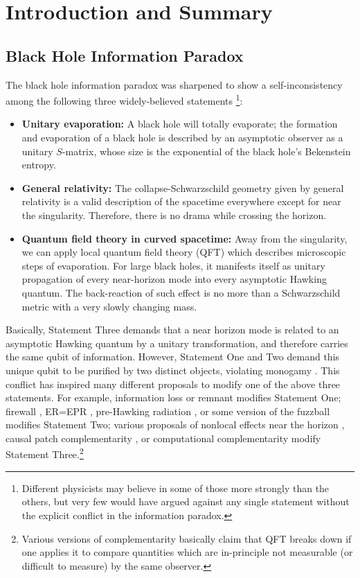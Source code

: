 \documentclass[aps,showpacs,onecolumn,floats,prd,superscriptaddress,nofootinbib]{revtex4-1}
\begin{document}
\maketitle


\section{Introduction and Summary}

\subsection{Black Hole Information Paradox}

The black hole information paradox \cite{Haw76a} was sharpened to show a self-inconsistency among the following three widely-believed statements \cite{AMPS}\footnote{Different physicists may believe in some of those more strongly than the others, but very few would have argued against any single statement without the explicit conflict in the information paradox.}:
\begin{itemize}
\item {\bf Unitary evaporation:} A black hole will totally evaporate; the formation and evaporation of a black hole is described by an asymptotic observer as a unitary $S$-matrix, whose size is the exponential of the black hole's Bekenstein entropy.
\item {\bf General relativity:} The collapse-Schwarzschild geometry given by general relativity is a valid description of the spacetime everywhere except for near the singularity.
Therefore, there is no drama while crossing the horizon.
\item {\bf Quantum field theory in curved spacetime:} Away from the singularity, we can apply local quantum field theory (QFT) which describes microscopic steps of evaporation. 
For large black holes, it manifests itself as unitary propagation of every near-horizon mode into every asymptotic Hawking quantum. The back-reaction of such effect is no more than a Schwarzschild metric with a very slowly changing mass.
\end{itemize}
Basically, Statement Three demands that a near horizon mode is related to an asymptotic Hawking quantum by a unitary transformation, and therefore carries the same qubit of information. 
However, Statement One and Two demand this unique qubit to be purified by two distinct objects, violating monogamy \cite{Bou13}. 
This conflict has inspired many different proposals to modify one of the above three statements. 
For example, information loss or remnant \cite{Bek94} modifies Statement One; 
firewall \cite{BraPir09,AMPS}, ER=EPR \cite{MalSus13}, pre-Hawking radiation \cite{KawMat13,Ho16}, or some version of the fuzzball \cite{Mat15} modifies Statement Two;
various proposals of nonlocal effects near the horizon \cite{Gid12,DodSil15,OsuPag16}, causal patch complementarity \cite{HuiYan13,IlgYan13,LowTho14}, or computational complementarity \cite{HH} modify Statement Three.\footnote{Various versions of complementarity basically claim that QFT breaks down if one applies it to compare quantities which are in-principle not measurable (or difficult to measure) by the same observer.} 
\end{document}
